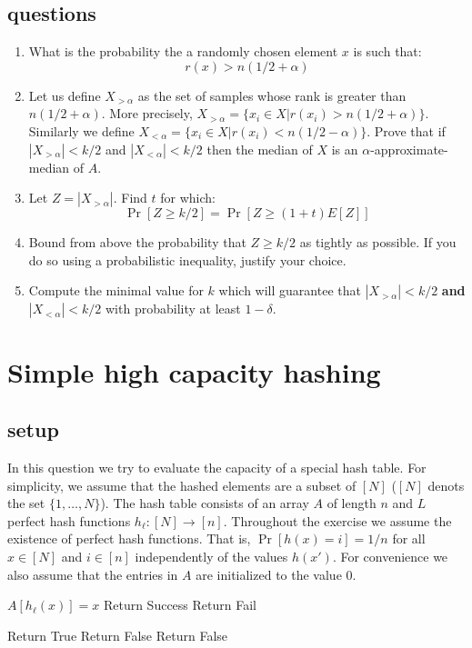 \subsection*{questions}
\begin{enumerate}
\item What is the probability the a randomly chosen element $x$ is
such that:
\[
r(x) > n(1/2 + \alpha)
\]
\item Let us define $X_{>\alpha}$ as the set of samples whose rank
is greater than $n(1/2 + \alpha)$. More precisely, $X_{>\alpha} =
\{x_i \in X | r(x_i) > n(1/2 + \alpha)\}$. Similarly we define
$X_{<\alpha} = \{x_i \in X | r(x_i) < n(1/2 - \alpha)\}$. Prove that
if $|X_{>\alpha}| < k/2$ and $|X_{<\alpha}| < k/2$ then the median
of $X$ is an $\alpha$-approximate-median of $A$.
\item Let $Z = |X_{>\alpha}|$. Find $t$ for which:
\[
\Pr[Z \ge k/2] = \Pr[Z \ge (1+t)E[Z]]
\]
\item Bound from above the probability that $Z \ge k/2$ as tightly
as possible. If you do so using a probabilistic inequality, justify
your choice.
\item Compute the minimal value for $k$ which will guarantee that
$|X_{>\alpha}| < k/2$ {\bf and} $|X_{<\alpha}| < k/2$ with
probability at least $1-\delta$.
\end{enumerate}
\pagebreak


\section{Simple high capacity hashing}
\subsection*{setup}
In this question we try to evaluate the capacity of a special hash table.
For simplicity, we assume that the hashed elements are a subset of $[N]$ ($[N]$ denots the set $\{1,\dots,N\}$).
The hash table consists of an array $A$ of length $n$ and $L$ perfect hash functions $h_\ell: [N] \rightarrow [n]$.
Throughout the exercise we assume the existence of perfect hash functions. That is, $\Pr[h(x) = i] = 1/n$ for all $x \in [N]$ and $i\in [n]$ 
independently of the values $h(x')$.  For convenience we also assume that the entries in $A$ are initialized to the value $0$.
%
\begin{algorithm}
\caption{$Add(x)$}
\begin{algorithmic}
\FOR {$\ell \in [L]$}
    	\STATE $A[h_\ell(x)] = x$
	\STATE Return Success
    \ENDIF
\ENDFOR
\STATE Return Fail
\end{algorithmic}
\end{algorithm}
%
\vspace{-.6cm}
\begin{algorithm}
\caption{$Query(x)$}
\begin{algorithmic}
\FOR {$\ell \in [L]$}
	\STATE Return True
   	\STATE Return False
    \ENDIF
\ENDFOR
\STATE Return False
\end{algorithmic}
\end{algorithm}
%
\vspace{-.6cm}
